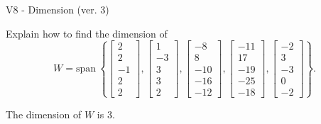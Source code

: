 \begin{exercise}
  \begin{exerciseTitle}V8 - Dimension (ver. 3)\end{exerciseTitle}
  \begin{exerciseStatement}
    Explain how to find the dimension of 
\[W=\mathrm{span}\ \left\{\left[\begin{array}{r}
2 \\
2 \\
-1 \\
2 \\
2
\end{array}\right] , \left[\begin{array}{r}
1 \\
-3 \\
3 \\
3 \\
2
\end{array}\right] , \left[\begin{array}{r}
-8 \\
8 \\
-10 \\
-16 \\
-12
\end{array}\right] , \left[\begin{array}{r}
-11 \\
17 \\
-19 \\
-25 \\
-18
\end{array}\right] , \left[\begin{array}{r}
-2 \\
3 \\
-3 \\
0 \\
-2
\end{array}\right]\right\}.\]



  \end{exerciseStatement}
  \begin{exerciseAnswer}
   The dimension of \(W\) is  \(3\).
  


  \end{exerciseAnswer}
\end{exercise}